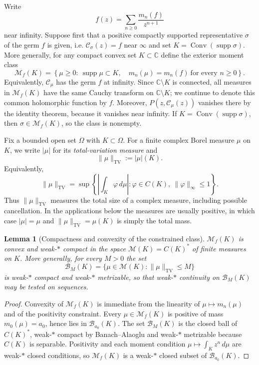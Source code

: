 \documentclass[reqno]{amsart}
\newtheorem{lemma}[theorem]{Lemma}
\theoremstyle{definition}
\theoremstyle{remark}
\newcommand{\bC}{\mathbb C}
\newcommand{\M}{\mathcal M}
\newcommand{\Cauchy}{\mathcal C}
\newcommand{\supp}{\operatorname{supp}}
\newcommand{\Conv}{\operatorname{Conv}}
\newcommand{\TV}{\mathrm{TV}}
\begin{document}
Write
\[
 f(z)=\sum_{n\ge0}\frac{m_n(f)}{z^{n+1}}
\]
near infinity.  Suppose first that a positive compactly supported representative
$\sigma$ of the germ $f$ is given, i.e. $\Cauchy_\sigma(z)=f$ near $\infty$ and set $K=\Conv(\supp\sigma)$.  More generally,
for any compact convex set $K\subset\bC$ define the exterior moment class
\begin{equation}\label{eq:moment-class}
 \M_f(K)=\left\{\mu\ge0:\ \supp\mu\subset K,\quad
 m_n(\mu)=m_n(f)\ \text{for every }n\ge0\right\}.
\end{equation}
Equivalently, $\Cauchy_\mu$ has the germ $f$ at infinity.  Since
$\bC\setminus K$ is connected, all measures in $\M_f(K)$ have the same Cauchy
transform on $\bC\setminus K$; we continue to denote this common holomorphic
function by $f$.  Moreover, $P(z,\Cauchy_\mu(z))$ vanishes there by the identity
theorem, because it vanishes near infinity.  If
$K=\Conv(\supp\sigma)$, then $\sigma\in\M_f(K)$, so the class is nonempty.

Fix a bounded open set $\Omega$ with $K\subset\Omega$.
 For a finite complex Borel measure $\mu$ on $K$, we write $|\mu|$ for its
\emph{total-variation measure} and
\begin{equation}\label{eq:TV-definition}
 \|\mu\|_{\TV}:=|\mu|(K).
\end{equation}
Equivalently,
\[
 \|\mu\|_{\TV}
 =\sup\left\{\left|\int_K\varphi\,d\mu\right|:
               \varphi\in C(K),\ \|\varphi\|_\infty\le1\right\}.
\]
Thus $\|\mu\|_{\TV}$ measures the total size of a complex measure, including
possible cancellation.  In the applications below the measures are usually
positive, in which case $|\mu|=\mu$ and $\|\mu\|_{\TV}=\mu(K)$ is simply the
total mass.

\begin{lemma}[Compactness and convexity of the constrained class]
\label{lem:compact-class}
$\M_f(K)$ is convex and weak-$*$ compact in the space $\M(K)=C(K)^*$ of finite
measures on $K$.  More generally, for every $M>0$ the set
\[
 \mathcal B_M(K)=\{\mu\in\M(K):\|\mu\|_{\TV}\leq M\}
\]
is weak-$*$ compact and weak-$*$ metrizable, so that weak-$*$ continuity on
$\mathcal B_M(K)$ may be tested on sequences.
\end{lemma}

\begin{proof}
Convexity of $\M_f(K)$ is immediate from the linearity of $\mu\mapsto m_n(\mu)$
and of the positivity constraint.  Every $\mu\in\M_f(K)$ is positive of mass
$m_0(\mu)=a_0$, hence lies in $\mathcal B_{a_0}(K)$.  The set
$\mathcal B_M(K)$ is the closed ball of $C(K)^*$, weak-$*$ compact by
Banach--Alaoglu and weak-$*$ metrizable because $C(K)$ is separable.  Positivity
and each moment condition $\mu\mapsto\int_Kz^n\,d\mu$ are weak-$*$ closed
conditions, so $\M_f(K)$ is a weak-$*$ closed subset of $\mathcal B_{a_0}(K)$.
\end{proof}
\end{document}
